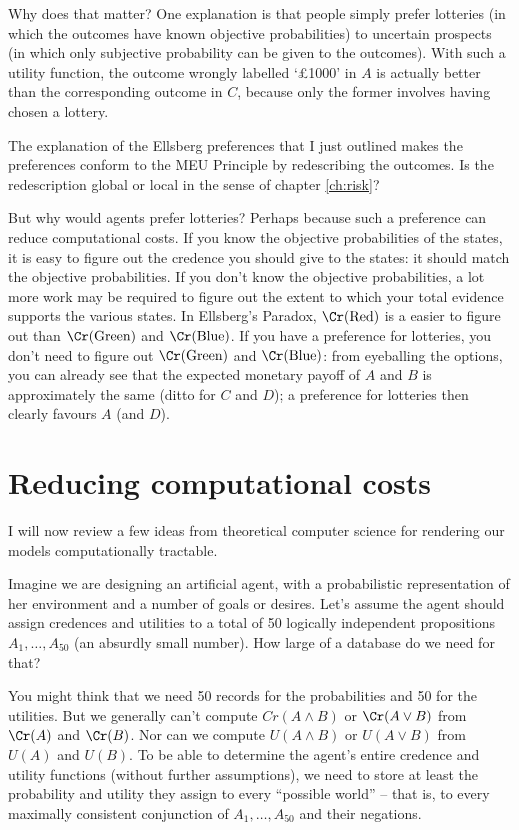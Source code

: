 Why does that matter? One explanation is that people simply prefer
lotteries (in which the outcomes have known objective
probabilities) to uncertain prospects (in which only subjective
probability can be given to the outcomes). With such a utility
function, the outcome wrongly labelled `£1000' in $A$ is actually
better than the corresponding outcome in $C$, because only the former
involves having chosen a lottery.

\begin{exercise}{1}
  The explanation of the Ellsberg preferences that I just outlined
  makes the preferences conform to the MEU Principle by redescribing
  the outcomes. Is the redescription global or local in the sense of
  chapter \ref{ch:risk}? 
\end{exercise}

But why would agents prefer lotteries? Perhaps because such a
preference can reduce computational costs. If you know the objective
probabilities of the states, it is easy to figure out the credence you
should give to the states: it should match the objective
probabilities. If you don't know the objective probabilities, a lot
more work may be required to figure out the extent to which your total
evidence supports the various states. In Ellsberg's Paradox,
$\Cr(\text{Red})$ is a easier to figure out than $\Cr(\text{Green})$
and $\Cr(\text{Blue})$. If you have a preference for lotteries, you
don't need to figure out $\Cr(\text{Green})$ and $\Cr(\text{Blue})$:
from eyeballing the options, you can already see that the expected
monetary payoff of $A$ and $B$ is approximately the same (ditto for
$C$ and $D$); a preference for lotteries then clearly favours $A$ (and
$D$).


\section{Reducing computational costs}

I will now review a few ideas from theoretical computer science for
rendering our models computationally tractable.

Imagine we are designing an artificial agent, with a probabilistic
representation of her environment and a number of goals or
desires. Let's assume the agent should assign credences and
utilities to a total of 50 logically independent propositions
$A_1,\ldots,A_{50}$ (an absurdly small number).
How large of a database do we need for that?

You might think that we need 50 records for the probabilities and 50
for the utilities. But we generally can't compute $Cr(A \land B)$ or
$\Cr(A \lor B)$ from $\Cr(A)$ and $\Cr(B)$. Nor can we compute
$U(A \land B)$ or $U(A \lor B)$ from $U(A)$ and $U(B)$. To be able to
determine the agent's entire credence and utility functions (without
further assumptions), we need to store at least the probability and
utility they assign to every ``possible world'' -- that is, to every
maximally consistent conjunction of $A_1,\ldots,A_{50}$ and their
negations.

